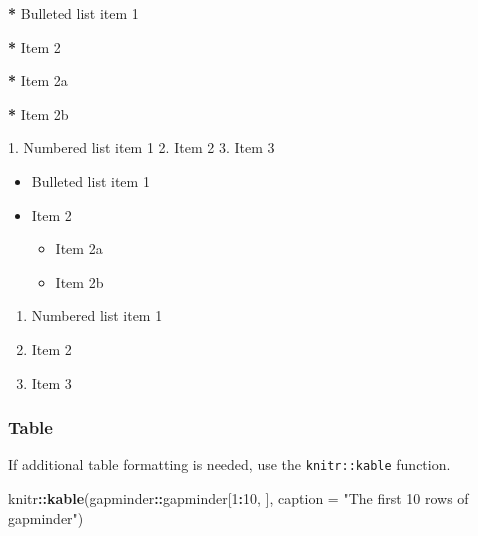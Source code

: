 \documentclass[11pt,]{article}
\newenvironment{Shaded}{\begin{snugshade}}{\end{snugshade}}
\newcommand{\KeywordTok}[1]{\textcolor[rgb]{0.13,0.29,0.53}{\textbf{#1}}}
\newcommand{\DataTypeTok}[1]{\textcolor[rgb]{0.13,0.29,0.53}{#1}}
\newcommand{\DecValTok}[1]{\textcolor[rgb]{0.00,0.00,0.81}{#1}}
\newcommand{\StringTok}[1]{\textcolor[rgb]{0.31,0.60,0.02}{#1}}
\newcommand{\OperatorTok}[1]{\textcolor[rgb]{0.81,0.36,0.00}{\textbf{#1}}}
\newcommand{\NormalTok}[1]{#1}
\providecommand{\tightlist}{%
  \setlength{\itemsep}{0pt}\setlength{\parskip}{0pt}}
\begin{document}
\begin{Shaded}
\begin{Highlighting}[]
\OperatorTok{*}\StringTok{   }\NormalTok{Bulleted list item }\DecValTok{1}

\OperatorTok{*}\StringTok{   }\NormalTok{Item }\DecValTok{2}

    \OperatorTok{*}\StringTok{ }\NormalTok{Item 2a}

    \OperatorTok{*}\StringTok{ }\NormalTok{Item 2b}

\DecValTok{1}\NormalTok{.  Numbered list item }\DecValTok{1}
\DecValTok{2}\NormalTok{. Item }\DecValTok{2}
\DecValTok{3}\NormalTok{. Item }\DecValTok{3}
\end{Highlighting}
\end{Shaded}

\begin{itemize}
\item
  Bulleted list item 1
\item
  Item 2

  \begin{itemize}
  \item
    Item 2a
  \item
    Item 2b
  \end{itemize}
\end{itemize}

\begin{enumerate}
\def\labelenumi{\arabic{enumi}.}
\tightlist
\item
  Numbered list item 1
\item
  Item 2
\item
  Item 3
\end{enumerate}

\subsubsection{Table}\label{table}

If additional table formatting is needed, use the \texttt{knitr::kable}
function.

\begin{Shaded}
\begin{Highlighting}[]
\NormalTok{knitr}\OperatorTok{::}\KeywordTok{kable}\NormalTok{(gapminder}\OperatorTok{::}\NormalTok{gapminder[}\DecValTok{1}\OperatorTok{:}\DecValTok{10}\NormalTok{, ],}
             \DataTypeTok{caption =} \StringTok{"The first 10 rows of gapminder"}\NormalTok{)}
\end{Highlighting}
\end{Shaded}
\end{document}
